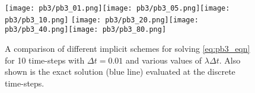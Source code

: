 \documentclass[11pt]{article}
\newcommand{\dt}{\Delta t}
\begin{document}
\begin{figure}[ht]
\begin{center}
\texttt{[image: pb3/pb3\_01.png]}\texttt{[image: pb3/pb3\_05.png]}\texttt{[image: pb3/pb3\_10.png]}
\texttt{[image: pb3/pb3\_20.png]}\texttt{[image: pb3/pb3\_40.png]}\texttt{[image: pb3/pb3\_80.png]}
\end{center}
\caption{A comparison of different implicit schemes for solving \eqref{eq:pb3_eqn} for 10 time-steps with $\dt=0.01$ and various values of $\lambda \dt$. Also shown is the exact solution (blue line) evaluated at the discrete time-steps.}
\label{fig:pb3}
\end{figure}
\end{document}
